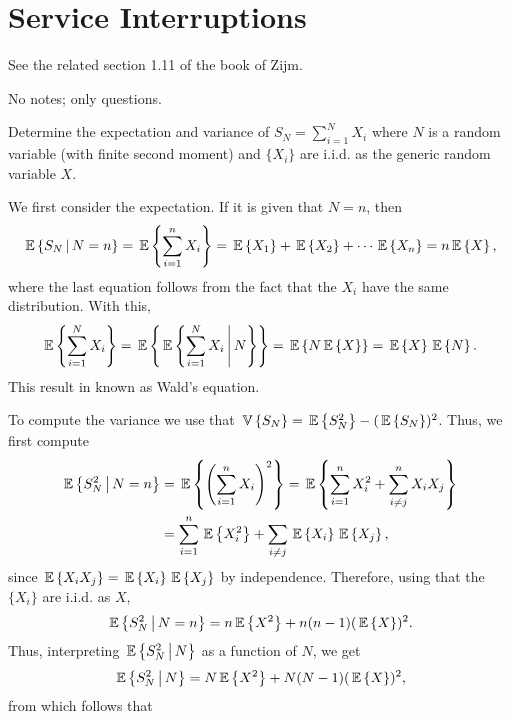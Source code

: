 \section{Service Interruptions}
\label{sec:serv-interr}

See the related section 1.11 of the book of Zijm.

No notes; only questions.


\begin{question}
  Determine the expectation and variance of $S_N = \sum_{i=1}^N X_i$
  where $N$ is a random variable (with finite second moment) and
  $\{X_i\}$ are i.i.d. as the generic random variable $X$.
\begin{solution}
We first consider the
expectation.  If it is given that $N=n$, then
\begin{equation*}
  \,\mathbb{E}\left\{S_N \,\middle|\, N=n\right\} =  \,\mathbb{E}\left\{\sum_{i=1}^n X_i\right\}= \,\mathbb{E}\left\{X_1\right\} + \,\mathbb{E}\left\{X_2\right\} + \cdots \,\mathbb{E}\left\{X_n\right\} = n \,\mathbb{E}\left\{X\right\},
\end{equation*}
where the last equation follows from the fact that the $X_i$ have the same distribution. With this, 
\begin{equation*}
  \,\mathbb{E}\left\{\sum_{i=1}^N X_i\right\} =   \,\mathbb{E}\left\{\,\mathbb{E}\left\{\sum_{i=1}^N X_i \,\middle|\, N\right\}\right\} =  \,\mathbb{E}\left\{N\,\mathbb{E}\left\{X\right\}\right\} = \,\mathbb{E}\left\{X\right\} \,\mathbb{E}\left\{N\right\}.
\end{equation*}
This result in known as Wald's equation. 

To compute the variance we use that $\,\mathbb{V}\left\{S_N\right\} =\,\mathbb{E}\left\{S_N^2\right\} - (\,\mathbb{E}\left\{S_N\right\})^2$. Thus, we first compute
\begin{equation*}
  \begin{split}
  \,\mathbb{E}\left\{ S_N^2 \,\middle|\,  N=n\right\} 
&=  \,\mathbb{E}\left\{\left(\sum_{i=1}^n X_i\right)^2\right\}  
=  \,\mathbb{E}\left\{\sum_{i=1}^n X_i^2 + \sum_{i\neq j}^n X_i X_j\right\}  \\
&= \sum_{i=1}^n \,\mathbb{E}\left\{X^2_i\right\} + \sum_{i \neq j} \,\mathbb{E}\left\{X_i\right\} \,\mathbb{E}\left\{X_j\right\},
  \end{split}
\end{equation*}
since $\,\mathbb{E}\left\{X_iX_j\right\} = \,\mathbb{E}\left\{X_i\right\} \,\mathbb{E}\left\{X_j\right\}$ by independence. Therefore, using
that the $\{X_i\}$ are i.i.d. as $X$,
\begin{equation*}
  \,\mathbb{E}\left\{ S_N^2 \,\middle|\, N=n\right\} = n \,\mathbb{E}\left\{X^2\right\} + n(n-1) (\,\mathbb{E}\left\{X\right\})^2. 
\end{equation*}
Thus, interpreting $\,\mathbb{E}\left\{S_N^2\,\middle|\, N\right\}$ as a function of $N$, we get
\begin{equation*}
  \,\mathbb{E}\left\{ S_N^2 \,\middle|\, N\right\} = N \,\mathbb{E}\left\{X^2\right\} + N(N-1) (\,\mathbb{E}\left\{X\right\})^2,
\end{equation*}
from which follows that


\end{solution}
\end{question}
